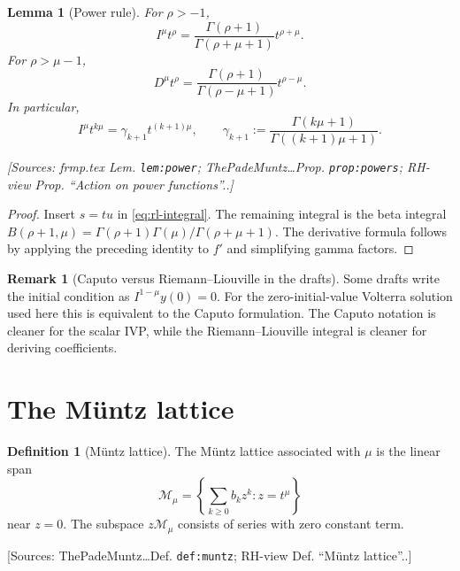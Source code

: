 \documentclass[11pt]{article}
\newtheorem{lemma}[theorem]{Lemma}
\theoremstyle{definition}
\newtheorem{definition}[theorem]{Definition}
\newtheorem{remark}[theorem]{Remark}
\newcommand{\Source}[1]{\par\smallskip\noindent\textup{[Sources: #1.]}}
\begin{document}
\begin{lemma}[Power rule]\label{lem:power-rule}
For $\rho>-1$,
\begin{equation}\label{eq:power-int}
        I^{\mu}t^{\rho}
        =\frac{\Gamma(\rho+1)}{\Gamma(\rho+\mu+1)}t^{\rho+\mu}.
\end{equation}
For $\rho>\mu-1$,
\begin{equation}\label{eq:power-der}
        D^{\mu}t^{\rho}
        =\frac{\Gamma(\rho+1)}{\Gamma(\rho-\mu+1)}t^{\rho-\mu}.
\end{equation}
In particular,
\begin{equation}\label{eq:gamma-k}
        I^{\mu}t^{k\mu}
        =\gamma_{k+1}t^{(k+1)\mu},
        \qquad
        \gamma_{k+1}:=\frac{\Gamma(k\mu+1)}{\Gamma((k+1)\mu+1)}.
\end{equation}
\Source{frmp.tex Lem. \texttt{lem:power}; ThePadeMuntz\ldots Prop. \texttt{prop:powers}; RH-view Prop. ``Action on power functions''.}
\end{lemma}

\begin{proof}
Insert $s=tu$ in \eqref{eq:rl-integral}.
The remaining integral is the beta integral
$B(\rho+1,\mu)=\Gamma(\rho+1)\Gamma(\mu)/\Gamma(\rho+\mu+1)$.
The derivative formula follows by applying the preceding identity to $f'$ and simplifying gamma factors.
\end{proof}

\begin{remark}[Caputo versus Riemann--Liouville in the drafts]
Some drafts write the initial condition as $I^{1-\mu}y(0)=0$.
For the zero-initial-value Volterra solution used here this is equivalent to the Caputo formulation.
The Caputo notation is cleaner for the scalar IVP,
while the Riemann--Liouville integral is cleaner for deriving coefficients.
\end{remark}

\section{The Müntz lattice}

\begin{definition}[Müntz lattice]\label{def:muntz-lattice}
The Müntz lattice associated with $\mu$ is the linear span
\begin{equation}\label{eq:muntz-space}
        \mathcal{M}_{\mu}=\left\{\sum_{k\ge0}b_k z^k: z=t^{\mu}\right\}
\end{equation}
near $z=0$.
The subspace $z\mathcal{M}_{\mu}$ consists of series with zero constant term.
\Source{ThePadeMuntz\ldots Def. \texttt{def:muntz}; RH-view Def. ``Müntz lattice''.}
\end{definition}
\end{document}
